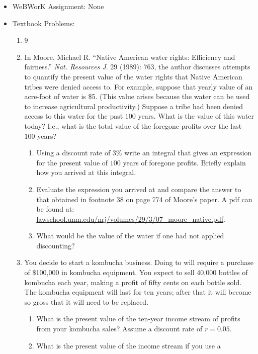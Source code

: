 \documentclass[12pt]{article}
\begin{document}
\begin{itemize}
\setlength{\itemsep}{0mm}
\item WeBWorK Assignment: None
\item Textbook Problems:
  \begin{enumerate}
  \setlength{\itemsep}{-1mm}
    \item 9
    \item In Moore, Michael R. ``Native American water rights:
      Efficiency and fairness.'' \emph{Nat. Resources J}. 29 (1989):
      763, the author discusses attempts to quantify the present value
      of the water rights that Native American tribes were denied
      access to.  For example, suppose that yearly value of an
      acre-foot of water is \$5.  (This value arises because the water
      can be used to increase agricultural productivity.)  Suppose a
      tribe had been denied access to this water for the past $100$
      years.  What is the value of this water today?  I.e., what is
      the total value of the foregone profits over the last $100$
      years?  
    \begin{enumerate}
        \item Using a discount rate of $3$\% write an integral that
          gives an expression for the present value of $100$ years of
          foregone profits.  Briefly explain how you arrived at this
          integral. 
        \item Evaluate the expression you arrived at and compare the
          answer to that obtained in footnote 38 on page 774 of
          Moore's paper.  A pdf can be found at:
  \url{lawschool.unm.edu/nrj/volumes/29/3/07_moore_native.pdf}. 
        \item What would be the value of the water if one had not
          applied discounting?  
    \end{enumerate}
  \item You decide to start a kombucha business.  Doing to will
    require a purchase of \$100,000 in kombucha equipment.  You expect
    to sell 40,000 bottles of kombucha each year, making a profit of
    fifty cents on each bottle sold.  The kombucha equipment will last
    for ten years; after that it will become so gross that it will
    need to be replaced. 
\begin{enumerate}
     \item What is the present value of the ten-year income stream of
       profits from your kombucha sales?  Assume a discount rate of
       $r=0.05$. 
     \item What is the present value of the income stream if you use a

\end{enumerate}
\end{enumerate}
\end{itemize}
\end{document}
